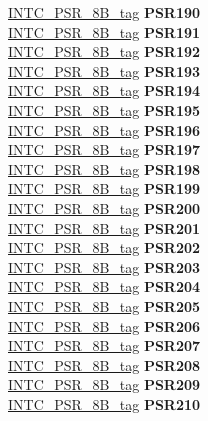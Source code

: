 \begin{DoxyCompactItemize}
\begin{tabbing}
\>\>\mbox{\hyperlink{unionINTC__PSR__8B__tag}{INTC\_PSR\_8B\_tag}} {\bfseries PSR190}\\
\>\>\mbox{\hyperlink{unionINTC__PSR__8B__tag}{INTC\_PSR\_8B\_tag}} {\bfseries PSR191}\\
\>\>\mbox{\hyperlink{unionINTC__PSR__8B__tag}{INTC\_PSR\_8B\_tag}} {\bfseries PSR192}\\
\>\>\mbox{\hyperlink{unionINTC__PSR__8B__tag}{INTC\_PSR\_8B\_tag}} {\bfseries PSR193}\\
\>\>\mbox{\hyperlink{unionINTC__PSR__8B__tag}{INTC\_PSR\_8B\_tag}} {\bfseries PSR194}\\
\>\>\mbox{\hyperlink{unionINTC__PSR__8B__tag}{INTC\_PSR\_8B\_tag}} {\bfseries PSR195}\\
\>\>\mbox{\hyperlink{unionINTC__PSR__8B__tag}{INTC\_PSR\_8B\_tag}} {\bfseries PSR196}\\
\>\>\mbox{\hyperlink{unionINTC__PSR__8B__tag}{INTC\_PSR\_8B\_tag}} {\bfseries PSR197}\\
\>\>\mbox{\hyperlink{unionINTC__PSR__8B__tag}{INTC\_PSR\_8B\_tag}} {\bfseries PSR198}\\
\>\>\mbox{\hyperlink{unionINTC__PSR__8B__tag}{INTC\_PSR\_8B\_tag}} {\bfseries PSR199}\\
\>\>\mbox{\hyperlink{unionINTC__PSR__8B__tag}{INTC\_PSR\_8B\_tag}} {\bfseries PSR200}\\
\>\>\mbox{\hyperlink{unionINTC__PSR__8B__tag}{INTC\_PSR\_8B\_tag}} {\bfseries PSR201}\\
\>\>\mbox{\hyperlink{unionINTC__PSR__8B__tag}{INTC\_PSR\_8B\_tag}} {\bfseries PSR202}\\
\>\>\mbox{\hyperlink{unionINTC__PSR__8B__tag}{INTC\_PSR\_8B\_tag}} {\bfseries PSR203}\\
\>\>\mbox{\hyperlink{unionINTC__PSR__8B__tag}{INTC\_PSR\_8B\_tag}} {\bfseries PSR204}\\
\>\>\mbox{\hyperlink{unionINTC__PSR__8B__tag}{INTC\_PSR\_8B\_tag}} {\bfseries PSR205}\\
\>\>\mbox{\hyperlink{unionINTC__PSR__8B__tag}{INTC\_PSR\_8B\_tag}} {\bfseries PSR206}\\
\>\>\mbox{\hyperlink{unionINTC__PSR__8B__tag}{INTC\_PSR\_8B\_tag}} {\bfseries PSR207}\\
\>\>\mbox{\hyperlink{unionINTC__PSR__8B__tag}{INTC\_PSR\_8B\_tag}} {\bfseries PSR208}\\
\>\>\mbox{\hyperlink{unionINTC__PSR__8B__tag}{INTC\_PSR\_8B\_tag}} {\bfseries PSR209}\\
\>\>\mbox{\hyperlink{unionINTC__PSR__8B__tag}{INTC\_PSR\_8B\_tag}} {\bfseries PSR210}\\

\end{tabbing}
\end{DoxyCompactItemize}
